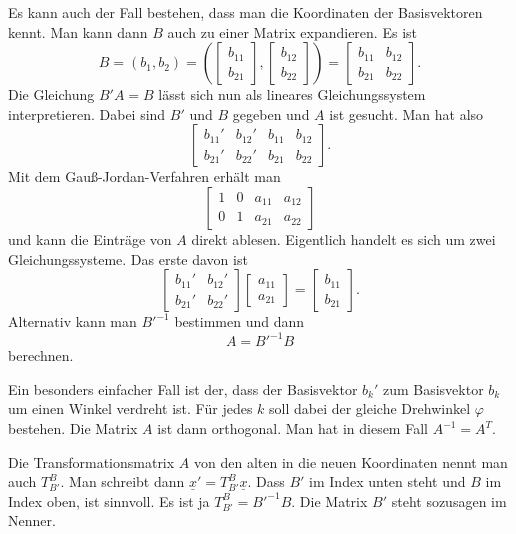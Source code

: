 \documentclass[a4paper,10pt,fleqn,twocolumn,twoside]{article}
\begin{document}
Es kann auch der Fall bestehen, dass man die Koordinaten der
Basisvektoren kennt. Man kann dann $B$ auch zu einer Matrix
expandieren. Es ist
\[B = (b_1,b_2)
= (\begin{bmatrix}b_{11}\\ b_{21}\end{bmatrix},
\begin{bmatrix}b_{12}\\ b_{22}\end{bmatrix})
= \begin{bmatrix}
b_{11} & b_{12}\\
b_{21} & b_{22}
\end{bmatrix}.\]
Die Gleichung $B'A=B$ lässt sich nun als lineares Gleichungssystem
interpretieren. Dabei sind $B'$ und $B$ gegeben und $A$ ist
gesucht. Man hat also
\[\left[\begin{array}{cc|cc}
b_{11}' & b_{12}' & b_{11} & b_{12}\\
b_{21}' & b_{22}' & b_{21} & b_{22}
\end{array}\right].\]
Mit dem Gauß-Jordan-Verfahren erhält man
\[\left[\begin{array}{cc|cc}
1 & 0 & a_{11} & a_{12}\\
0 & 1 & a_{21} & a_{22}
\end{array}\right]\]
und kann die Einträge von $A$ direkt ablesen.
Eigentlich handelt es sich um zwei Gleichungssysteme.
Das erste davon ist
\[\begin{bmatrix}
b_{11}' & b_{12}'\\
b_{21}' & b_{22}'
\end{bmatrix}
\begin{bmatrix}
a_{11}\\ a_{21}
\end{bmatrix}
= \begin{bmatrix}
b_{11}\\ b_{21}
\end{bmatrix}.\]
Alternativ kann man $B'^{-1}$ bestimmen und dann
\[A = B'^{-1}B\]
berechnen.

Ein besonders einfacher Fall ist der, dass der Basisvektor $b_k'$
zum Basisvektor $b_k$ um einen Winkel verdreht ist. Für jedes $k$
soll dabei der gleiche Drehwinkel $\varphi$ bestehen. Die Matrix
$A$ ist dann orthogonal. Man hat in diesem Fall $A^{-1}=A^T$. 

Die Transformationsmatrix $A$ von den
alten in die neuen Koordinaten nennt man auch $T_{B'}^B$.
Man schreibt dann $\underline x'=T_{B'}^B\underline x$.
Dass $B'$ im Index unten steht und $B$ im Index oben, ist sinnvoll.
Es ist ja $T_{B'}^B=B'^{-1}B$. Die Matrix $B'$ steht sozusagen
im Nenner.
\end{document}
